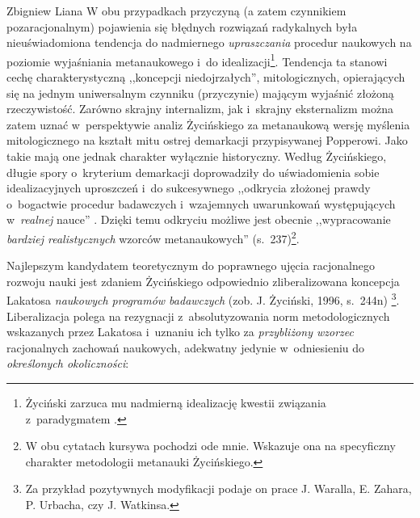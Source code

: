 \begin{artplenv}{Zbigniew Liana}
W obu przypadkach przyczyną (a zatem czynnikiem pozaracjonalnym) pojawienia się błędnych rozwiązań radykalnych była
nieuświadomiona tendencja do nadmiernego \textit{upraszczania} procedur naukowych na poziomie wyjaśniania
metanaukowego i~do idealizacji\footnote{Życiński zarzuca mu nadmierną idealizację kwestii związania z~paradygmatem
\parencite*[zob.][s.~152]{zycinski_jezyk_1983}.
}. Tendencja ta stanowi cechę charakterystyczną ,,koncepcji niedojrzałych'',
mitologicznych, opierających się na jednym uniwersalnym czynniku (przyczynie) mającym wyjaśnić złożoną rzeczywistość.
Zarówno skrajny internalizm, jak i~skrajny eksternalizm można zatem uznać w~perspektywie analiz Życińskiego za
metanaukową wersję myślenia mitologicznego na kształt mitu ostrej demarkacji przypisywanej Popperowi. Jako takie mają
one jednak charakter wyłącznie historyczny. Według Życińskiego, długie spory o~kryterium demarkacji doprowadziły do
uświadomienia sobie idealizacyjnych uproszczeń i~do sukcesywnego ,,odkrycia złożonej prawdy o~bogactwie procedur
badawczych i~wzajemnych uwarunkowań występujących w~\textit{realnej} nauce''
\parencite[s.~230]{zycinski_elementy_1996}.
Dzięki temu odkryciu możliwe jest obecnie ,,wypracowanie \textit{bardziej realistycznych} wzorców
metanaukowych'' (s.~237)\footnote{W obu cytatach kursywa
pochodzi ode mnie. Wskazuje ona na specyficzny charakter metodologii metanauki Życińskiego.}.

Najlepszym kandydatem teoretycznym do poprawnego ujęcia racjonalnego rozwoju nauki jest zdaniem Życińskiego odpowiednio
zliberalizowana koncepcja Lakatosa \textit{naukowych programów badawczych}
\label{ref:RNDR4AQgoKDGC}(zob. J. Życiński, 1996, s.~244n)
\parencite[s.~244n]{zycinski_elementy_1996}\footnote{Za przykład pozytywnych modyfikacji podaje on prace J. Waralla, E. Zahara, P. Urbacha, czy J.
Watkinsa.}. Liberalizacja polega na rezygnacji z~absolutyzowania norm metodologicznych wskazanych przez
Lakatosa i~uznaniu ich tylko za \textit{przybliżony wzorzec} racjonalnych zachowań naukowych, adekwatny
jedynie w~odniesieniu do
\textit{określonych okoliczności}:


\end{artplenv}
